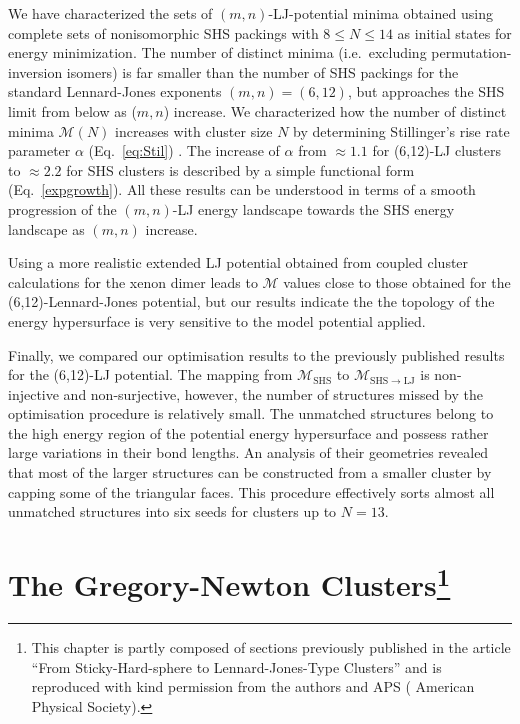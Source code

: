We have characterized the sets of $(m,n)$-LJ-potential minima obtained using
complete sets of nonisomorphic SHS packings with $8 \leq N \leq 14$
\autocite{Arkus_Minimalenergyclusters_2009,Arkus_DerivingFiniteSphere_2011,Hoy_Structurefinitesphere_2012,Hoy_Structuredynamicsmodel_2015,Holmes-Cerfon_EnumeratingRigidSphere_2016}
as initial states for energy minimization.  The number of distinct minima
(i.e.~excluding permutation-inversion isomers) is far smaller than the number
of SHS packings for the standard Lennard-Jones exponents $(m,n) = (6,12)$, but
approaches the SHS limit from below as ($m,n$) increase.  We characterized how
the number of distinct minima $\mathcal{M}(N)$ increases with cluster size $N$
by determining Stillinger's rise rate parameter $\alpha$ (Eq.\ \ref{eq:Stil})
\autocite{Stillinger_Exponentialmultiplicityinherent_1999}.  The increase of
$\alpha$ from $\approx 1.1$ for (6,12)-LJ clusters to $\approx 2.2$ for SHS
clusters is described by a simple functional form (Eq.\ \ref{expgrowth}).  All
these results  can be understood in terms of a smooth progression of the
$(m,n)$-LJ energy landscape towards the SHS energy landscape as $(m,n)$
increase.

Using a more realistic extended LJ potential obtained from coupled cluster
calculations for the xenon dimer
\autocite{Schwerdtfeger_ExtensionLennardJonespotential_2006,Jerabek_relativisticcoupledclusterinteraction_2017}
leads to $\mathcal{M}$ values close to those obtained for the
(6,12)-Lennard-Jones potential, but our results indicate the the topology of
the energy hypersurface is very sensitive to the model potential applied.  

Finally, we compared our optimisation results to the previously published
results for the (6,12)-LJ potential. The mapping from $\mathcal{M}_\text{SHS}$
to $\mathcal{M}_\mathrm{SHS\to LJ}$ is non-injective and non-surjective,
however, the number of structures missed by the optimisation procedure is
relatively small. The unmatched structures belong to the high energy region of
the potential energy hypersurface and possess rather large variations in their
bond lengths. An analysis of their geometries revealed that most of the larger
structures can be constructed from a smaller cluster by capping some of the
triangular faces. This procedure effectively sorts almost all unmatched
structures into six seeds for clusters up to $N=13$.


\chapter[The Gregory-Newton Clusters]{
    The Gregory-Newton Clusters\footnote{This chapter is partly composed of sections
    previously published in the article ``From Sticky-Hard-sphere to
    Lennard-Jones-Type Clusters''\autocite{} and is reproduced with kind
    permission from the authors and APS ( American Physical
    Society).}
}
\label{sec:thegregorynewtonclusters}

